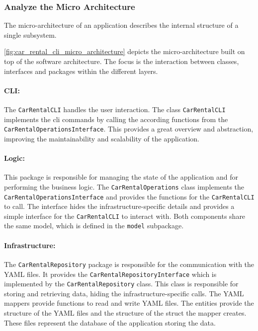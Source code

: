 \subsubsection*{Analyze the Micro Architecture}
The micro-architecture of an application describes the internal structure of a single subsystem.

\autoref{fig:car_rental_cli_micro_architecture} depicts the micro-architecture built on top of the software architecture.
The focus is the interaction between classes, interfaces and packages within the different layers.

\paragraph*{CLI:}
The \texttt{CarRentalCLI} handles the user interaction.
The class \texttt{CarRentalCLI} implements the cli commands by calling the according functions from the \hfill \linebreak \texttt{CarRentalOperationsInterface}.
This provides a great overview and abstraction, improving the maintainability and scalability of the application.

\paragraph*{Logic:}
This package is responsible for managing the state of the application and for performing the business logic.
The \texttt{CarRentalOperations} class implements the \texttt{CarRentalOperationsInterface} and provides the functions for the \texttt{CarRentalCLI} to call.
The interface hides the infrastructure-specific details and provides a simple interface for the \texttt{CarRentalCLI} to interact with.
Both components share the same model, which is defined in the \texttt{model} subpackage.

\paragraph*{Infrastructure:}
The \texttt{CarRentalRepository} package is responsible for the communication with the YAML files.
It provides the \texttt{CarRentalRepositoryInterface} which is implemented by the \texttt{CarRentalRepository} class.
This class is responsible for storing and retrieving data, hiding the infrastructure-specific calls.
The YAML mappers provide functions to read and write YAML files.
The entities provide the structure of the YAML files and the structure of the struct the mapper creates.
These files represent the database of the application storing the data.

